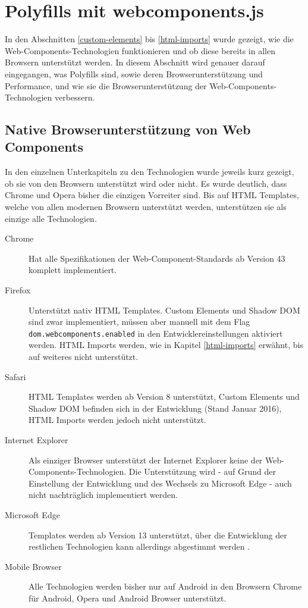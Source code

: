 \section{Polyfills mit webcomponents.js}\label{polyfills-mit-webcomponents.js}

In den Abschnitten \ref{custom-elements} bis \ref{html-imports} wurde gezeigt, wie die Web-Components-Technologien funktionieren und ob diese bereits in allen Browsern unterstützt werden. In diesem Abschnitt wird genauer darauf eingegangen, was Polyfills sind, sowie deren Browserunterstützung und Performance, und wie sie die Browserunterstützung der Web-Components-Technologien verbessern.


\subsection{Native Browserunterstützung von Web Components}\label{native-browserunterstuxfctzung-von-web-components}

In den einzelnen Unterkapiteln zu den Technologien wurde jeweils kurz gezeigt, ob sie von den Browsern unterstützt wird oder nicht. Es wurde deutlich, dass Chrome und Opera bisher die einzigen Vorreiter sind. Bis auf \ac{HTML} Templates, welche von allen modernen Browsern unterstützt werden, unterstützen sie als einzige alle Technologien. \cite{citeulike:13914379}

\begin{description}
  \item[Chrome] Hat alle Spezifikationen der Web-Component-Standards ab Version 43 komplett implementiert.
  \item[Firefox] Unterstützt nativ \ac{HTML} Templates. Custom Elements und Shadow \ac{DOM} sind zwar implementiert, müssen aber manuell mit dem Flag \texttt{dom.webcomponents.enabled} in den Entwicklereinstellungen aktiviert werden. \ac{HTML} Imports werden, wie in Kapitel \ref{html-imports} erwähnt, bis auf weiteres nicht unterstützt.
  \item[Safari] \ac{HTML} Templates werden ab Version 8 unterstützt, Custom Elements und Shadow \ac{DOM} befinden sich in der Entwicklung (Stand Januar 2016), \ac{HTML} Imports werden jedoch nicht unterstützt.
  \item[Internet Explorer] Als einziger Browser unterstützt der Internet Explorer keine der Web-Components-Technologien. Die Unterstützung wird - auf Grund der Einstellung der Entwicklung und des Wechsels zu Microsoft Edge - auch nicht nachträglich implementiert werden.
  \item[Microsoft Edge] Templates werden ab Version 13 unterstützt, über die Entwicklung der restlichen Technologien kann allerdings abgestimmt werden \cite{citeulike:13914237}.
  \item[Mobile Browser] Alle Technologien werden bisher nur auf Android in den Browsern Chrome für Android, Opera und Android Browser unterstützt.
\end{description}

